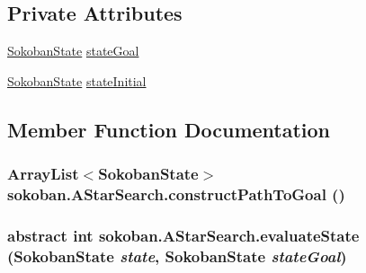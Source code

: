 \subsection*{Private Attributes}
\begin{CompactItemize}
\item 
\hyperlink{classsokoban_1_1SokobanState}{SokobanState} \hyperlink{classsokoban_1_1AStarSearch_b79570b0700c83ab7f3ef553923b5c00}{stateGoal}
\item 
\hyperlink{classsokoban_1_1SokobanState}{SokobanState} \hyperlink{classsokoban_1_1AStarSearch_901a2b83227c005d77f95879e8059081}{stateInitial}
\end{CompactItemize}


\subsection{Member Function Documentation}
\hypertarget{classsokoban_1_1AStarSearch_8c634122d21a511f5df4587d005ab8fb}{
\subsubsection[{constructPathToGoal}]{\setlength{\rightskip}{0pt plus 5cm}ArrayList$<${\bf SokobanState}$>$ sokoban.AStarSearch.constructPathToGoal ()}}
\label{classsokoban_1_1AStarSearch_8c634122d21a511f5df4587d005ab8fb}


\hypertarget{classsokoban_1_1AStarSearch_7f5d111fd7504dc6d47dece202a26b6e}{
\subsubsection[{evaluateState}]{\setlength{\rightskip}{0pt plus 5cm}abstract int sokoban.AStarSearch.evaluateState ({\bf SokobanState} {\em state}, \/  {\bf SokobanState} {\em stateGoal})}}
\label{classsokoban_1_1AStarSearch_7f5d111fd7504dc6d47dece202a26b6e}





